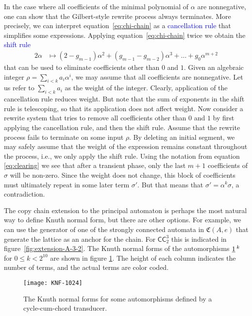 \documentclass[12pt]{svmult}
\def\emph#1{\textcolor{blue}{#1}}
\def\CCC#1#2{\mathsf{CC}^{#1}_{#2}}
\def\F#1{\underline{\smash{#1}}\,}       %
\def\cmpaut{\fC}                %
\def\fC{\mathfrak{C}}           %
\begin{document}
In the case where all coefficients of the minimal polynomial of $\alpha$ are nonnegative,
one can show that the Gilbert-style rewrite process always terminates. 
More precisely, we can interpret equation~\eqref{eq:chi-chain} 
as a \emph{cancellation rule} that simplifies some expressions. 
Applying equation~\eqref{eq:chi-chain} twice we obtain the  \emph{shift rule}
\begin{align} 
\label{eq:shift}
  2 \alpha   & \mapsto (2 - g_{m-1}) \alpha^{2} + (g_{m-1}-g_{m-2}) \alpha^{3} + \ldots + g_{0} \alpha^{m+2} 
\end{align}
%
that can be used to eliminate coefficients other than $0$ and $1$. 
Given an algebraic integer  $\rho = \sum_{i<k} a_{i} \alpha^{i}$, we may assume that all 
coefficients are nonnegative.  
Let us refer to $\sum_{i<k} a_{i}$ as the weight of the integer. 
Clearly, application of the cancellation rule reduces weight. 
But note that the sum of exponents in the shift rule is telescoping, so that its 
application does not affect weight. 
Now consider a rewrite system that tries to remove all coefficients other than $0$ and $1$
by first applying the cancellation rule, and then the shift rule. 
Assume that the rewrite process fails to terminate on some input $\rho$. 
By deleting an initial segment, we may safely assume that the weight of the expression 
remains constant throughout the process, i.e., we only apply the shift rule.
Using the notation from equation \eqref{eq:clearing} we see that 
after a transient phase, only the last $m+1$  coefficients of $\sigma$ will be non-zero. 
Since the weight does not change, this block of coefficients must ultimately repeat 
in some later term $\sigma'$.
But that means that $\sigma' = \alpha^{k} \sigma$, a contradiction. 

The copy chain extension to the principal automaton is perhaps the most natural way to
define Knuth normal form, but there are other options. 
For example, we can use the generator of one of the strongly connected automata in 
$\cmpaut(A,e)$ that generate the lattice as an anchor for the chain. 
For $\CCC{3}{2}$ this is indicated in figure~\ref{fig:extension-A-3-2}. 
The Knuth normal forms of the automorphisms $\F{1}^{k}$ for $0 \leq k < 2^{10}$ are 
shown in figure \ref{fig:knf-1024}.
The height of each column indicates the number of terms, and the actual terms 
are color coded. 

\begin{figure}[ht]
\hspace*{-12mm} 
\texttt{[image: KNF-1024]}
\caption{The Knuth normal forms for some automorphisms defined by a cycle-cum-chord transducer.}
\label{fig:knf-1024}
\end{figure}
\end{document}
